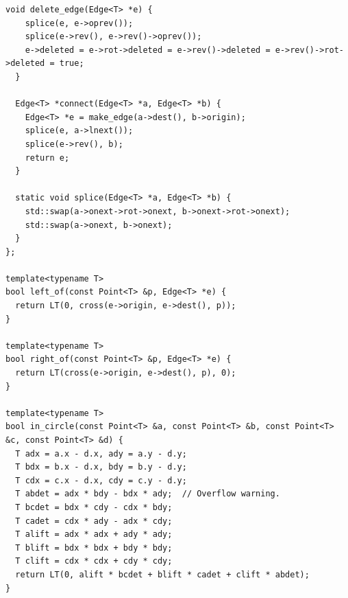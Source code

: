 \begin{lstlisting}[style=cpp]
  void delete_edge(Edge<T> *e) {
    splice(e, e->oprev());
    splice(e->rev(), e->rev()->oprev());
    e->deleted = e->rot->deleted = e->rev()->deleted = e->rev()->rot->deleted = true;
  }

  Edge<T> *connect(Edge<T> *a, Edge<T> *b) {
    Edge<T> *e = make_edge(a->dest(), b->origin);
    splice(e, a->lnext());
    splice(e->rev(), b);
    return e;
  }

  static void splice(Edge<T> *a, Edge<T> *b) {
    std::swap(a->onext->rot->onext, b->onext->rot->onext);
    std::swap(a->onext, b->onext);
  }
};

template<typename T>
bool left_of(const Point<T> &p, Edge<T> *e) {
  return LT(0, cross(e->origin, e->dest(), p));
}

template<typename T>
bool right_of(const Point<T> &p, Edge<T> *e) {
  return LT(cross(e->origin, e->dest(), p), 0);
}

template<typename T>
bool in_circle(const Point<T> &a, const Point<T> &b, const Point<T> &c, const Point<T> &d) {
  T adx = a.x - d.x, ady = a.y - d.y;
  T bdx = b.x - d.x, bdy = b.y - d.y;
  T cdx = c.x - d.x, cdy = c.y - d.y;
  T abdet = adx * bdy - bdx * ady;  // Overflow warning.
  T bcdet = bdx * cdy - cdx * bdy;
  T cadet = cdx * ady - adx * cdy;
  T alift = adx * adx + ady * ady;
  T blift = bdx * bdx + bdy * bdy;
  T clift = cdx * cdx + cdy * cdy;
  return LT(0, alift * bcdet + blift * cadet + clift * abdet);
}


\end{lstlisting}
